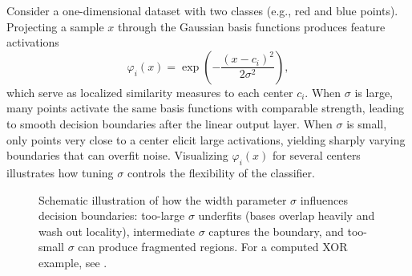 Consider a one-dimensional dataset with two classes (e.g., red and blue points). Projecting a sample \(x\) through the Gaussian basis functions produces feature activations
\[
\varphi_i(x) = \exp\!\left(-\frac{(x - c_i)^2}{2\sigma^2}\right),
\]
which serve as localized similarity measures to each center \(c_i\). When \(\sigma\) is large, many points activate the same basis functions with comparable strength, leading to smooth decision boundaries after the linear output layer. When \(\sigma\) is small, only points very close to a center elicit large activations, yielding sharply varying boundaries that can overfit noise. Visualizing \(\varphi_i(x)\) for several centers illustrates how tuning \(\sigma\) controls the flexibility of the classifier.

\begin{figure}[t]
    \centering
\caption{Schematic illustration of how the width parameter \(\sigma\) influences decision boundaries: too-large \(\sigma\) underfits (bases overlap heavily and wash out locality), intermediate \(\sigma\) captures the boundary, and too-small \(\sigma\) can produce fragmented regions. For a computed XOR example, see .}
    \label{fig:rbf_sigma_sweep}
\end{figure}
\FloatBarrier

